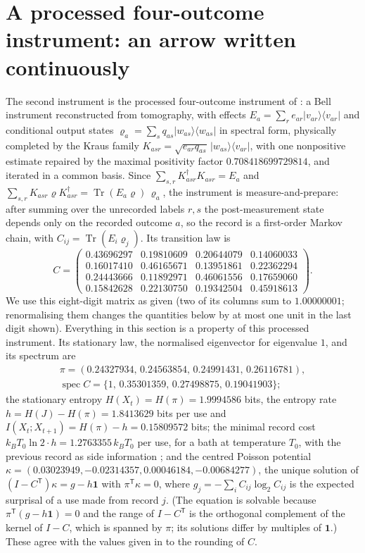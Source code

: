 \documentclass[11pt]{article}
\theoremstyle{definition}\newtheorem{definition}[theorem]{Definition}
\theoremstyle{remark}\newtheorem{remark}[theorem]{Remark}
\begin{document}
\section{A processed four-outcome instrument: an arrow written continuously}\label{sec:four}
The second instrument is the processed four-outcome instrument of \cite{Singh}: a Bell instrument reconstructed from tomography, with effects $E_a=\sum_re_{ar}|v_{ar}\rangle\langle v_{ar}|$ and conditional output states $\varrho_a=\sum_sq_{as}|w_{as}\rangle\langle w_{as}|$ in spectral form, physically completed by the Kraus family $K_{asr}=\sqrt{e_{ar}q_{as}}\,|w_{as}\rangle\langle v_{ar}|$, with one nonpositive estimate repaired by the maximal positivity factor $0.708418699729814$, and iterated in a common basis. Since $\sum_{s,r}K_{asr}^\dagger K_{asr}=E_a$ and $\sum_{s,r}K_{asr}\varrho K_{asr}^\dagger=\operatorname{Tr}(E_a\varrho)\,\varrho_a$, the instrument is measure-and-prepare: after summing over the unrecorded labels $r,s$ the post-measurement state depends only on the recorded outcome $a$, so the record is a first-order Markov chain, with $C_{ij}=\operatorname{Tr}(E_i\varrho_j)$. Its transition law is
\[
C=\begin{pmatrix}
0.43696297&0.19810609&0.20644079&0.14060033\\
0.16017410&0.46165671&0.13951861&0.22362294\\
0.24443666&0.11892971&0.46061556&0.17659060\\
0.15842628&0.22130750&0.19342504&0.45918613\end{pmatrix}.
\]
We use this eight-digit matrix as given (two of its columns sum to $1.00000001$; renormalising them changes the quantities below by at most one unit in the last digit shown). Everything in this section is a property of this processed instrument. Its stationary law, the normalised eigenvector for eigenvalue $1$, and its spectrum are
\begin{gather*}
\pi=(0.24327934,\,0.24563854,\,0.24991431,\,0.26116781),\\
\operatorname{spec}C=\{1,\,0.35301359,\,0.27498875,\,0.19041903\};
\end{gather*}
the stationary entropy $H(X_t)=H(\pi)=1.9994586$ bits, the entropy rate $h=H(J)-H(\pi)=1.8413629$ bits per use and $I(X_t;X_{t+1})=H(\pi)-h=0.15809572$ bits; the minimal record cost $k_BT_0\ln2\cdot h=1.2763355\,k_BT_0$ per use, for a bath at temperature $T_0$, with the previous record as side information \cite{delRio}; and the centred Poisson potential $\kappa=(0.03023949,-0.02314357,0.00046184,-0.00684277)$, the unique solution of $(I-C^{\mathsf T})\kappa=g-h\mathbf 1$ with $\pi^{\mathsf T}\kappa=0$, where $g_j=-\sum_iC_{ij}\log_2C_{ij}$ is the expected surprisal of a use made from record $j$. (The equation is solvable because $\pi^{\mathsf T}(g-h\mathbf 1)=0$ and the range of $I-C^{\mathsf T}$ is the orthogonal complement of the kernel of $I-C$, which is spanned by $\pi$; its solutions differ by multiples of $\mathbf 1$.) These agree with the values given in \cite{Singh} to the rounding of $C$.
\end{document}
